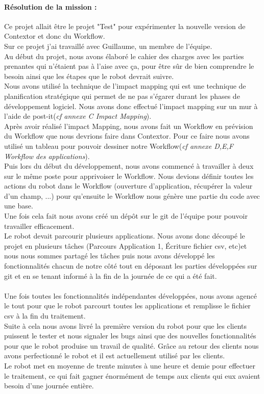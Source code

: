 \documentclass[a4paper,twoside,12pt,openright]{report}
\begin{document}
\paragraph {Résolution de la mission :}
Ce projet allait être le projet "Test" pour expérimenter la nouvelle version de Contextor et donc du Workflow.\\
Sur ce projet j'ai travaillé avec Guillaume, un membre de l'équipe.\\
Au début du projet, nous avons élaboré le cahier des charges avec les parties prenantes qui n'étaient pas à l'aise avec ça, pour être sûr de bien comprendre le besoin ainsi que les étapes que le robot devrait suivre.\\
Nous avons utilisé la technique de l'impact mapping qui est une technique de planification stratégique qui permet de ne pas s'égarer durant les phases de développement logiciel. Nous avons donc effectué l'impact mapping sur un mur à l'aide de post-it(\emph{cf annexe C Impact Mapping}).\\
Après avoir réalisé l'impact Mapping, nous avons fait un Workflow en prévision du Workflow que nous devrions faire dans Contextor. Pour ce faire nous avons utilisé un tableau pour pouvoir dessiner notre Workflow(\emph{cf annexe D,E,F Workflow des applications}).\\
Puis lors du début du développement, nous avons commencé à travailler à deux sur le même poste pour apprivoiser le Workflow. Nous devions définir toutes les actions du robot dans le Workflow (ouverture d'application, récupérer la valeur d'un champ, ...) pour qu'ensuite le Workflow nous génère une partie du code avec une base.\\
Une fois cela fait nous avons créé un dépôt sur le git de l'équipe pour pouvoir travailler efficacement.\\
Le robot devait parcourir plusieurs applications. Nous avons donc découpé le projet en plusieurs tâches (Parcours Application 1, Écriture fichier csv, etc)et nous nous sommes partagé les tâches puis nous avons développé les fonctionnalités chacun de notre côté tout en déposant les parties développées sur git et en se tenant informé à la fin de la journée de ce qui a été fait.\\\\
Une fois toutes les fonctionnalités indépendantes développées, nous avons agencé le tout pour que le robot parcourt toutes les applications et remplisse le fichier csv à la fin du traitement.\\
Suite à cela nous avons livré la première version du robot pour que les clients puissent le tester et nous signaler les bugs ainsi que des nouvelles fonctionnalités pour que le robot produise un travail de qualité.
Grâce au retour des clients nous avons perfectionné le robot et il est actuellement utilisé par les clients.\\
Le robot met en moyenne de trente minutes à une heure et demie pour effectuer le traitement, ce qui fait gagner énormément de temps aux clients qui eux avaient besoin d'une journée entière.
\end{document}
